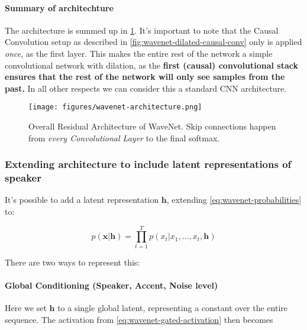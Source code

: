\paragraph{Summary of architechture}
The architecture is summed up in \cref{fig:wavenet-architecture}.
It's important to note that the Causal Convolution setup as described in \cref{fig:wavenet-dilated-causal-conv} only is applied \textit{once}, as the first layer.
This makes the entire rest of the network a simple convolutional network with dilation, as the \textbf{first (causal) convolutional stack ensures that the rest of the network will only see samples from the past.}
In all other respects we can consider this a standard CNN architecture. 


\begin{figure}
    \begin{small}
        \begin{center}
            \texttt{[image: figures/wavenet-architecture.png]}
        \end{center}
        \caption{Overall Residual Architecture of WaveNet. 
        Skip connections happen from \textit{every Convolutional Layer} to the final softmax.}
        \label{fig:wavenet-architecture}
    \end{small}
\end{figure}


\subsubsection{Extending architecture to include latent representations of speaker}
It's possible to add a latent representation \(\mathbf{h}\), extending \cref{eq:wavenet-probabilities} to:

\begin{equation}\label{eq:wavenet-probabilities-ext}
    p(\mathbf{x}|\mathbf{h}) = \prod_{t=1}^T  p(x_t | x_1, ..., x_t, \mathbf{h} )
\end{equation}

There are two ways to represent this:

\paragraph{Global Conditioning (Speaker, Accent, Noise level)}
Here we set \(\mathbf{h}\) to a single global latent, representing a constant over the entire sequence. 
The activation from \cref{eq:wavenet-gated-activation} then becomes

